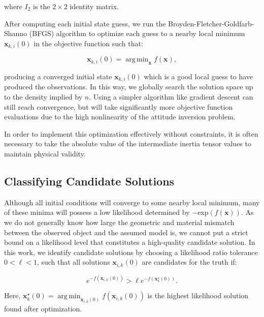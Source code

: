 \documentclass[a4paper,twocolumn]{spaceDebrisC} %
\newcommand{\vctr}[1]{\bm{#1}}
\DeclareMathOperator*{\argmin}{arg\,min}
\begin{document}
\noindent
where $I_2$ is the $2\times2$ identity matrix.

After computing each initial state guess, we run the Broyden-Fletcher-Goldfarb-Shanno (BFGS) algorithm \cite{broyden1970, fletcher1970, goldfarb1970, shanno1970} to optimize each guess to a nearby local minimum $\vctr{x}_{k,i}(0)$ in the objective function such that:

\begin{equation} \label{eq:opt_problem}
 \vctr{x}_{k,i}(0) = \argmin_{\vctr{x}} f(\vctr{x}),
\end{equation}

\noindent
producing a converged initial state $\vctr{x}_{k,i}(0)$ which is a good local guess to have produced the observations. In this way, we globally search the solution space up to the density implied by $n$. Using a simpler algorithm like gradient descent can still reach convergence, but will take significantly more objective function evaluations due to the high nonlinearity of the attitude inversion problem.

In order to implement this optimization effectively without constraints, it is often necessary to take the absolute value of the intermediate inertia tensor values to maintain physical validity. 

\subsection{Classifying Candidate Solutions} \label{sec:candidate_sols}

Although all initial conditions will converge to some nearby local minimum, many of these minima will possess a low likelihood determined by $-\mathrm{exp}(f(\vctr{x}))$. As we do not generally know how large the geometric and material mismatch between the observed object and the assumed model is, we cannot put a strict bound on a likelihood level that constitutes a high-quality candidate solution. In this work, we identify candidate solutions by choosing a likelihood ratio tolerance $0 < \ell < 1$, such that all solutions $\vctr{x}_{i,k}(0)$ are candidates for the truth if:

\begin{equation} \label{eq:ell_selection_criteria}
  e^{-f\left(\vctr{x}_{i,k}(0)\right)} > \ell e^{-f\left(\vctr{x}^\star_{k}(0)\right)}.
\end{equation}

Here, $\vctr{x}^\star_{k}(0) = \argmin_{\vctr{x}_{i,k}(0)} f\left(\vctr{x}_{i,k}(0)\right) $ is the highest likelihood solution found after optimization.
\end{document}
